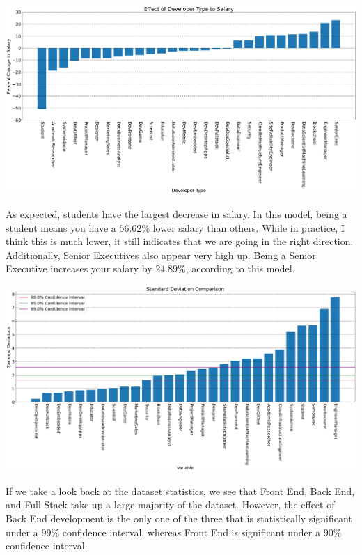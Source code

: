 \documentclass{report}
\begin{document}
\vspace{0.5in}

\includegraphics[width=0.9\linewidth]{model2coefficientdevtype.png}

\vspace{0.5in}

As expected, students have the largest decrease in salary. In this model, being a student means you have a $56.62\%$ lower salary than others. While in practice, I think this is much lower, it still indicates that we are going in the right direction. Additionally, Senior Executives also appear very high up. Being a Senior Executive increases your salary by $24.89\%$, according to this model.

\vspace{0.5in}

\includegraphics[width=0.9\linewidth]{model2confidencedevtype.png}

\vspace{0.5in}

If we take a look back at the dataset statistics, we see that Front End, Back End, and Full Stack take up a large majority of the dataset. However, the effect of Back End development is the only one of the three that is statistically significant under a $99\%$ confidence interval, whereas Front End is significant under a $90\%$ confidence interval.
\end{document}
